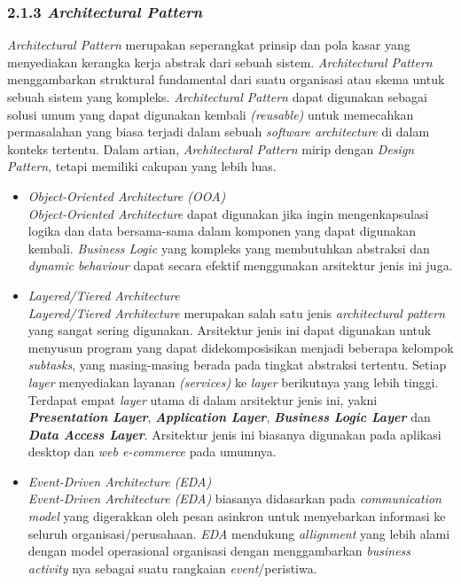 \documentclass[a4paper]{article}
\newcommand{\subsubbab}[1]{%
    \subsubsection*{#1}%
    \addcontentsline{toc}{subsubsection}{\protect\numberline{}#1}%
}
\begin{document}
\subsubbab{2.1.3 \textit{Architectural Pattern}}
\textit{Architectural Pattern} merupakan seperangkat prinsip dan pola kasar yang menyediakan kerangka kerja abstrak dari sebuah sistem. \textit{Architectural Pattern} menggambarkan struktural fundamental dari suatu organisasi atau skema untuk sebuah sistem yang kompleks. \textit{Architectural Pattern} dapat digunakan sebagai solusi umum yang dapat digunakan kembali \textit{(reusable)} untuk memecahkan permasalahan yang biasa terjadi dalam sebuah \textit{software architecture} di dalam konteks tertentu\autocite{architectural-pattern}. Dalam artian, \textit{Architectural Pattern} mirip dengan \textit{Design Pattern}, tetapi memiliki cakupan yang lebih luas\autocite{archi-pattern}.
\begin{itemize}
    \item \textit{Object-Oriented Architecture (OOA)}\\
          \textit{Object-Oriented Architecture} dapat digunakan jika ingin mengenkapsulasi logika dan data bersama-sama dalam komponen yang dapat digunakan kembali. \textit{Business Logic} yang kompleks yang membutuhkan abstraksi dan \textit{dynamic behaviour} dapat secara efektif menggunakan arsitektur jenis ini juga\autocite{architectural-pattern}.
    \item \textit{Layered/Tiered Architecture}\\
          \textit{Layered/Tiered Architecture} merupakan salah satu jenis \textit{architectural pattern} yang sangat sering digunakan\autocite{architectural-pattern}. Arsitektur jenis ini dapat digunakan untuk menyusun program yang dapat didekomposisikan menjadi beberapa kelompok \textit{subtasks}, yang masing-masing berada pada tingkat abstraksi tertentu. Setiap \textit{layer} menyediakan layanan \textit{(services)} ke \textit{layer} berikutnya yang lebih tinggi. Terdapat empat \textit{layer} utama di dalam arsitektur jenis ini, yakni \textbf{\textit{Presentation Layer}}, \textbf{\textit{Application Layer}}, \textbf{\textit{Business Logic Layer}} dan \textbf{\textit{Data Access Layer}}. Arsitektur jenis ini biasanya digunakan pada aplikasi desktop dan \textit{web e-commerce} pada umumnya\autocite{archi-pattern}.
    \item \textit{Event-Driven Architecture (EDA)}\\
          \textit{Event-Driven Architecture (EDA)} biasanya didasarkan pada \textit{communication model} yang digerakkan oleh pesan asinkron untuk menyebarkan informasi ke seluruh organisasi/perusahaan. \textit{EDA} mendukung \textit{allignment} yang lebih alami dengan model operasional organisasi dengan menggambarkan \textit{business activity} nya sebagai suatu rangkaian \textit{event}/peristiwa\autocite{architectural-pattern}.

\end{itemize}
\end{document}
